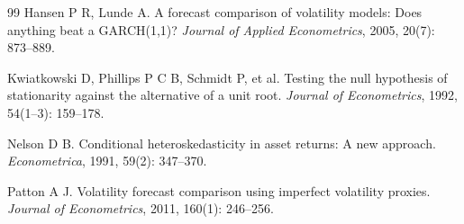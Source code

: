 \documentclass[12pt,a4paper]{article}
\begin{document}
\begin{thebibliography}{99}
Hansen P R, Lunde A.
\newblock A forecast comparison of volatility models: Does anything beat a GARCH(1,1)?
\newblock \textit{Journal of Applied Econometrics}, 2005, 20(7): 873--889.

Kwiatkowski D, Phillips P C B, Schmidt P, et al.
\newblock Testing the null hypothesis of stationarity against the alternative of a unit root.
\newblock \textit{Journal of Econometrics}, 1992, 54(1--3): 159--178.

Nelson D B.
\newblock Conditional heteroskedasticity in asset returns: A new approach.
\newblock \textit{Econometrica}, 1991, 59(2): 347--370.

Patton A J.
\newblock Volatility forecast comparison using imperfect volatility proxies.
\newblock \textit{Journal of Econometrics}, 2011, 160(1): 246--256.

\end{thebibliography}
\end{document}
